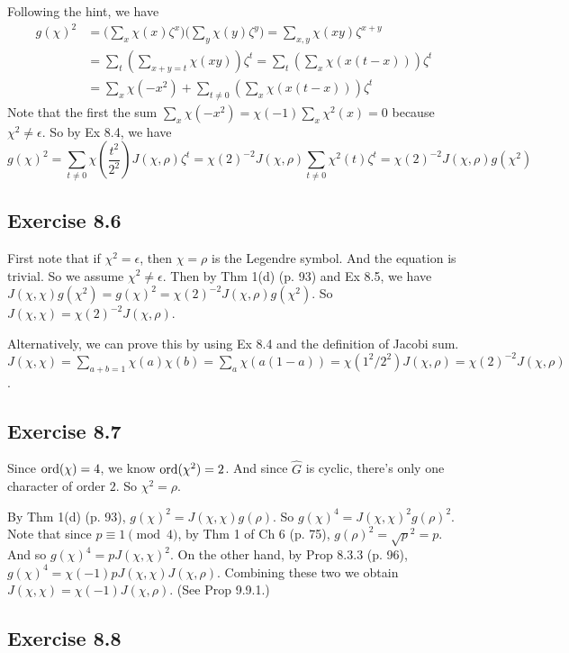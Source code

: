 \documentclass[../I&R.tex]{subfiles}
\begin{document}
Following the hint, we have
\begin{align*}
g(\chi)^2 &= \Biggl(\sum_x \chi(x)\zeta^x\Biggr)\Biggl(\sum_y \chi(y)\zeta^y\Biggr) = \sum_{x,y} \chi(xy)\zeta^{x+y} \\
&= \sum_t \left(\sum_{x+y=t} \chi(xy)\right)\zeta^t = \sum_t \left(\sum_x \chi(x(t-x))\right)\zeta^t \\
&= \sum_x \chi(-x^2) + \sum_{t\neq0}\left(\sum_x \chi(x(t-x))\right)\zeta^t
\end{align*}
Note that the first the sum $\sum_x \chi(-x^2) = \chi(-1)\sum_x \chi^2(x) =0$ because $\chi^2\neq\epsilon$. So by Ex 8.4, we have
$$g(\chi)^2 = \sum_{t\neq0} \chi\left(\frac{t^2}{2^2}\right)J(\chi,\rho)\zeta^t = \chi(2)^{-2}J(\chi,\rho) \sum_{t\neq0}\chi^2(t)\zeta^t = \chi(2)^{-2}J(\chi,\rho)g(\chi^2)$$

\subsection*{Exercise 8.6}

First note that if $\chi^2=\epsilon$, then $\chi=\rho$ is the Legendre symbol. And the equation is trivial. So we assume $\chi^2\neq\epsilon$. Then by Thm 1(d) (p. 93) and Ex 8.5, we have $J(\chi,\chi)g(\chi^2)=g(\chi)^2=\chi(2)^{-2}J(\chi,\rho)g(\chi^2)$. So $J(\chi,\chi)=\chi(2)^{-2}J(\chi,\rho)$.

Alternatively, we can prove this by using Ex 8.4 and the definition of Jacobi sum. $J(\chi,\chi) = \sum_{a+b=1} \chi(a)\chi(b) = \sum_a \chi(a(1-a)) = \chi(1^2/2^2)J(\chi,\rho) = \chi(2)^{-2}J(\chi,\rho)$.

\subsection*{Exercise 8.7}

Since $\operatorname{ord}(\chi)=4$, we know $\operatorname{ord}(\chi^2)=2$. And since $\hat{G}$ is cyclic, there's only one character of order $2$. So $\chi^2=\rho$.

By Thm 1(d) (p. 93), $g(\chi)^2=J(\chi,\chi)g(\rho)$. So $g(\chi)^4=J(\chi,\chi)^2g(\rho)^2$. Note that since $p\equiv1\pmod{4}$, by Thm 1 of Ch 6 (p. 75), $g(\rho)^2=\sqrt{p}^2=p$. And so $g(\chi)^4=pJ(\chi,\chi)^2$. On the other hand, by Prop 8.3.3 (p. 96), $g(\chi)^4=\chi(-1)pJ(\chi,\chi)J(\chi,\rho)$. Combining these two we obtain $J(\chi,\chi)=\chi(-1)J(\chi,\rho)$. (See Prop 9.9.1.)

\subsection*{Exercise 8.8}
\end{document}
